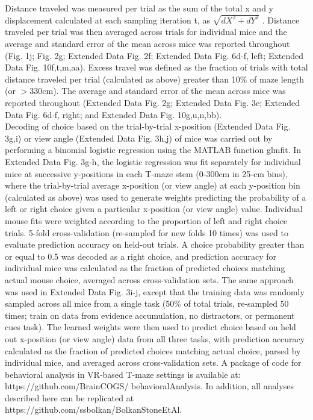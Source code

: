 Distance traveled was measured per trial as the sum of the total x and y displacement calculated at each sampling iteration t, as $\sqrt {dX^2 + dY^2}$ . Distance traveled per trial was then averaged across trials for individual mice and the average and standard error of the mean across mice was reported throughout (Fig. 1j; Fig. 2g; Extended Data Fig. 2f; Extended Data Fig. 6d-f, left; Extended Data Fig. 10f,t,m,aa). Excess travel was defined as the fraction of trials with total distance traveled per trial (calculated as above) greater than 10\% of maze length (or $>$330cm). The average and standard error of the mean across mice was reported throughout (Extended Data Fig. 2g; Extended Data Fig. 3e; Extended Data Fig. 6d-f, right; and Extended Data Fig. 10g,u,n,bb). \\
Decoding of choice based on the trial-by-trial x-position (Extended Data Fig. 3g,i) or view angle (Extended Data Fig. 3h,j) of mice was carried out by performing a binomial logistic regression using the MATLAB function glmfit. In Extended Data Fig. 3g-h, the logistic regression was fit separately for individual mice at successive y-positions in each T-maze stem (0-300cm in 25-cm bins), where the trial-by-trial average x-position (or view angle) at each y-position bin (calculated as above) was used to generate weights predicting the probability of a left or right choice given a particular x-position (or view angle) value. Individual mouse fits were weighted according to the proportion of left and right choice trials. 5-fold cross-validation (re-sampled for new folds 10 times) was used to evaluate prediction accuracy on held-out trials. A choice probability greater than or equal to 0.5 was decoded as a right choice, and prediction accuracy for individual mice was calculated as the fraction of predicted choices matching actual mouse choice, averaged across cross-validation sets. The same approach was used in Extended Data Fig. 3i-j, except that the training data was randomly sampled across all mice from a single task (50\% of total trials, re-sampled 50 times; train on data from evidence accumulation, no distractors, or permanent cues task). The learned weights were then used to predict choice based on held out x-position (or view angle) data from all three tasks, with prediction accuracy calculated as the fraction of predicted choices matching actual choice, parsed by individual mice, and averaged across cross-validation sets. A package of code for behavioral analysis in VR-based T-maze settings is available at: https://github.com/BrainCOGS/ behavioralAnalysis. In addition, all analyses described here can be replicated at https://github.com/ssbolkan/BolkanStoneEtAl.